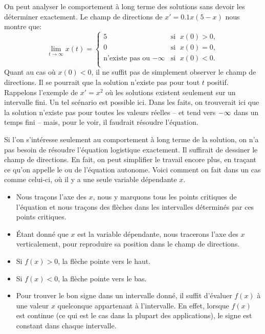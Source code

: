 On peut analyser le comportement à long terme des solutions sans devoir les déterminer exactement.
Le champ de directions de $x' = 0.1 x(5-x)$ nous montre que:
\begin{equation*}
	\lim_{t\to \infty} x(t) = 	\begin{cases}
								5 & \text{si } \; x(0) > 0 , \\
								0 & \text{si } \; x(0) = 0 , \\
								\text{n'existe pas ou } {-\infty} & \text{si } \; x(0) < 0 . \\
								\end{cases}
\end{equation*}
Quant au cas où $x(0) < 0$, il ne suffit pas de simplement observer le champ de directions.
Il se pourrait que la solution n'existe pas pour tout $t$ positif.
Rappelons l'exemple de $x' = x^2$ où les solutions existent seulement sur un intervalle fini.
Un tel scénario est possible ici.  Dans les faits, on trouverait ici que la solution n'existe
pas pour toutes les valeurs réelles -- et tend vers $-\infty$ dans un temps fini --  mais, pour le voir, il faudrait résoudre l'équation.

Si l'on s'intéresse seulement au comportement à long terme de la solution, on n'a pas besoin de résoudre l'équation logistique exactement.
Il suffirait de dessiner le champ de directions.
En fait, on peut simplifier le travail encore plus,
en traçant ce qu'on appelle le \emph{} ou
\emph{} de l'équation autonome.
Voici comment on fait dans un cas comme celui-ci, où il y a une seule variable dépendante $x$.
\begin{itemize}
	\item Nous traçons l'axe des $x$, nous y marquons tous les points critiques de l'équation et nous traçons des flèches dans les intervalles déterminés par ces points critiques.
	\item Étant donné que $x$ est la variable dépendante, nous tracerons l'axe des $x$ verticalement,
		pour reproduire sa position dans le champ de directions.
	\item Si $f(x) > 0$, la flèche pointe vers le haut.
	\item Si $f(x) < 0$, la flèche pointe vers le bas.
	\item Pour trouver le bon signe dans un intervalle donné, il suffit d'évaluer $f(x)$ à une valeur $x$ quelconque appartenant à l'intervalle.
	En effet, lorsque $f(x)$ est continue (ce qui est le cas dans la plupart des applications), le signe est constant dans chaque intervalle.
\end{itemize}

